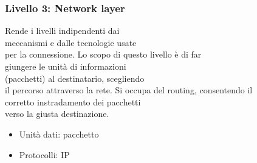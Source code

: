 \documentclass[aspectratio=169]{beamer}
\begin{document}
    \begin{frame}
        \frametitle{Livello 3: Network layer}
        Rende i livelli indipendenti dai\\meccanismi e dalle tecnologie usate\\per la connessione.
        \vskip 0.3cm
        Lo scopo di questo livello è di far\\giungere le unità di informazioni\\(pacchetti) al destinatario, scegliendo\\il percorso attraverso la rete.\vskip 0.3cm
        Si occupa del routing, consentendo il\\corretto instradamento dei pacchetti\\verso la giusta destinazione.
        \begin{itemize}
            \item Unità dati: pacchetto
            \item Protocolli: IP
        \end{itemize}
    \end{frame}
    
\end{document}
